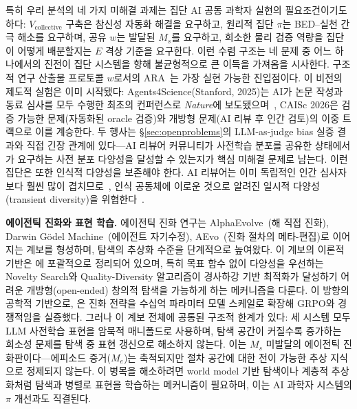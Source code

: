 \documentclass[11pt]{article}
\begin{document}
특히 우리 분석의 네 가지 미해결 과제는 집단 AI 공동 과학자 실현의 필요조건이기도 하다: $V_\text{collective}$ 구축은 참신성 자동화 해결을 요구하고, 원리적 집단 $\pi$는 BED--실천 간극 해소를 요구하며, 공유 $w$는 발달된 $M_s$를 요구하고, 희소한 물리 검증 역량을 집단이 어떻게 배분할지는 $E$ 격상 기준을 요구한다. 이런 수렴 구조는 네 문제 중 어느 하나에서의 진전이 집단 시스템을 향해 불균형적으로 큰 이득을 가져옴을 시사한다. 구조적 연구 산출물 프로토콜 $w$로서의 ARA~\citep{liu2026lasthuman}는 가장 실현 가능한 진입점이다. 이 비전의 제도적 실험은 이미 시작됐다: Agents4Science(Stanford, 2025)는 AI가 논문 작성과 동료 심사를 모두 수행한 최초의 컨퍼런스로 \emph{Nature}에 보도됐으며~\citep{gibney2025agents4science}, CAISc 2026은 검증 가능한 문제(자동화된 oracle 검증)와 개방형 문제(AI 리뷰 후 인간 검토)의 이중 트랙으로 이를 계승한다. 두 행사는 §\ref{sec:openproblems}의 LLM-as-judge bias 실증 결과와 직접 긴장 관계에 있다---AI 리뷰어 커뮤니티가 사전학습 분포를 공유한 상태에서 \citet{taniguchi2024cpc}가 요구하는 사전 분포 다양성을 달성할 수 있는지가 핵심 미해결 문제로 남는다. 이런 집단은 또한 인식적 다양성을 보존해야 한다. AI 리뷰어는 이미 독립적인 인간 심사자보다 훨씬 많이 겹치므로~\citep{kim2026aireviewers}, 인식 공동체에 이로운 것으로 알려진 일시적 다양성(transient diversity)을 위협한다~\citep{zollman2010epistemic}.

\textbf{에이전틱 진화와 표현 학습.} 에이전틱 진화 연구는 AlphaEvolve~\citep{georgiev2025alphaevolve}(해 직접 진화), Darwin G\"{o}del Machine~\citep{zhang2025dgm}(에이전트 자기수정), AEvo~\citep{aevo2026}(진화 절차의 메타-편집)로 이어지는 계보를 형성하며, 탐색의 추상화 수준을 단계적으로 높여왔다. 이 계보의 이론적 기반은 \citet{risi2025neuroevolution}에 포괄적으로 정리되어 있으며, 특히 목표 함수 없이 다양성을 우선하는 Novelty Search와 Quality-Diversity 알고리즘이 경사하강 기반 최적화가 달성하기 어려운 개방형(open-ended) 창의적 탐색을 가능하게 하는 메커니즘을 다룬다. 이 방향의 공학적 기반으로, \citet{sarkar2025eggroll}은 진화 전략을 수십억 파라미터 모델 스케일로 확장해 GRPO와 경쟁적임을 실증했다. 그러나 이 계보 전체에 공통된 구조적 한계가 있다: 세 시스템 모두 LLM 사전학습 표현을 암묵적 매니폴드로 사용하며, 탐색 공간이 커질수록 증가하는 희소성 문제를 탐색 중 표현 갱신으로 해소하지 않는다. 이는 $M_s$ 미발달의 에이전틱 진화판이다---에피소드 증거($M_e$)는 축적되지만 절차 공간에 대한 전이 가능한 추상 지식으로 정제되지 않는다. 이 병목을 해소하려면 world model 기반 탐색이나 계층적 추상화처럼 탐색과 병렬로 표현을 학습하는 메커니즘이 필요하며, 이는 AI 과학자 시스템의 $\pi$ 개선과도 직결된다.
\end{document}
